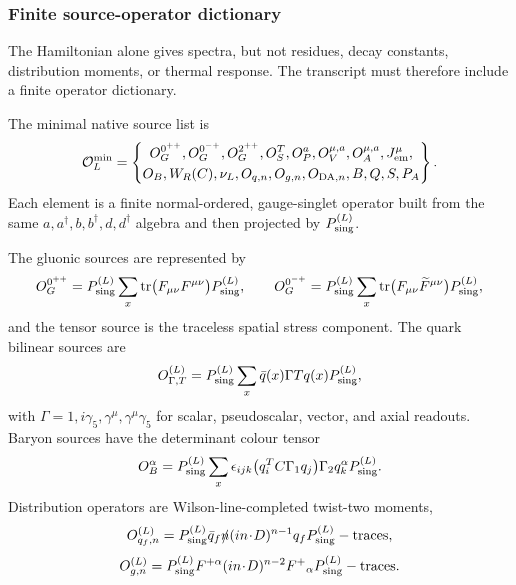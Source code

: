 \documentclass[12pt,a4paper]{article}
\begin{document}
\subsubsection{Finite source-operator dictionary}
\label{p10:subsec:finite-source-operator-dictionary}

The Hamiltonian alone gives spectra, but not residues, decay constants, distribution moments, or thermal response.  The transcript must therefore include a finite operator dictionary.

\begin{definition}
\label{p10:def:finite-source-operator-dictionary}
The minimal native source list is
\begin{equation}
\label{p10:eq:minimal-source-operator-dictionary}
\mathcal O_L^{\rm min}
=
\left\{\begin{gathered}
O_G^{0^{++}},O_G^{0^{-+}},O_G^{2^{++}},O_S^T,O_P^a,
O_V^{\mu,a},O_A^{\mu,a},J_{\rm em}^{\mu},\\
O_B,W_R(C),\nu_L,O_{q,n},O_{g,n},O_{{\rm DA},n},B,Q,S,P_A
\end{gathered}\right\}.
\end{equation}
Each element is a finite normal-ordered, gauge-singlet operator built from the same \(a,a^\dagger,b,b^\dagger,d,d^\dagger\) algebra and then projected by \(P_{\rm sing}^{(L)}\).
\end{definition}

The gluonic sources are represented by
\[
O_G^{0^{++}}=P_{\rm sing}^{(L)}\sum_x{\rm tr}\bigl(F_{\mu\nu}F^{\mu\nu}\bigr)P_{\rm sing}^{(L)},
\qquad
O_G^{0^{-+}}=P_{\rm sing}^{(L)}\sum_x{\rm tr}\bigl(F_{\mu\nu}\widetilde F^{\mu\nu}\bigr)P_{\rm sing}^{(L)},
\]
and the tensor source is the traceless spatial stress component.  The quark bilinear sources are
\[
O_{\Gamma,T}^{(L)}=P_{\rm sing}^{(L)}\sum_x\bar q(x)\Gamma Tq(x)P_{\rm sing}^{(L)},
\]
with \(\Gamma=1,i\gamma_5,\gamma^\mu,\gamma^\mu\gamma_5\) for scalar, pseudoscalar, vector, and axial readouts.  Baryon sources have the determinant colour tensor
\[
O_B^\alpha=P_{\rm sing}^{(L)}\sum_x\epsilon_{ijk}\bigl(q_i^T C\Gamma_1q_j\bigr)\Gamma_2q_k^\alpha P_{\rm sing}^{(L)}.
\]
Distribution operators are Wilson-line-completed twist-two moments,
\[
O_{q_f,n}^{(L)}=P_{\rm sing}^{(L)}\bar q_f\slashed n(i n\!\cdot\!D)^{n-1}q_f P_{\rm sing}^{(L)}-{\rm traces},
\]
\[
O_{g,n}^{(L)}=P_{\rm sing}^{(L)}F^{+\alpha}(i n\!\cdot\!D)^{n-2}F^+{}_{\alpha}P_{\rm sing}^{(L)}-{\rm traces}.
\]
\end{document}
